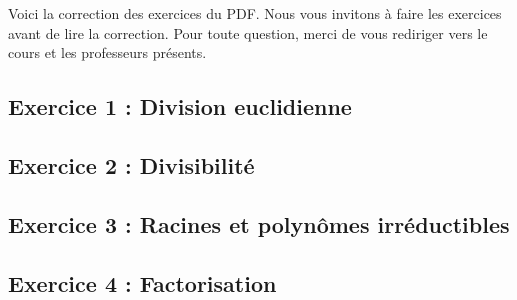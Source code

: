 \noindent Voici la correction des exercices du PDF. Nous vous invitons à faire les exercices avant de lire la correction. Pour toute question, merci de vous rediriger vers le cours et les professeurs présents.

\subsection{Exercice 1 : Division euclidienne}

\clearpage

\subsection{Exercice 2 : Divisibilité}

\clearpage

\subsection{Exercice 3 : Racines et polynômes irréductibles}

\clearpage

\subsection{Exercice 4 : Factorisation}

\clearpage